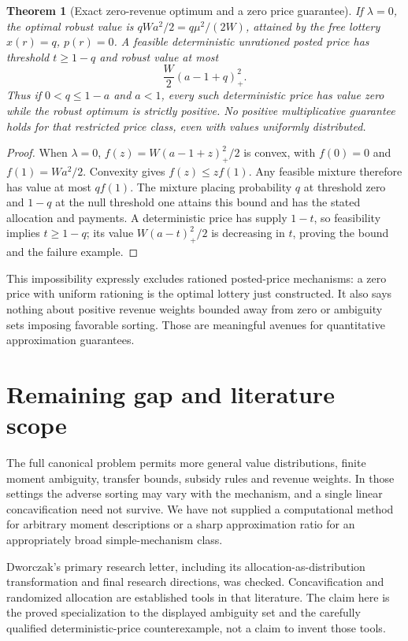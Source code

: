 \documentclass[11pt]{article}
\newtheorem{theorem}{Theorem}
\theoremstyle{remark}\newtheorem{remark}[theorem]{Remark}
\begin{document}
\begin{theorem}[Exact zero-revenue optimum and a zero price guarantee]
If $\lambda=0$, the optimal robust value is $qWa^2/2=q\mu^2/(2W)$, attained by the free lottery $x(r)=q$, $p(r)=0$. A feasible deterministic unrationed posted price has threshold $t\ge1-q$ and robust value at most
\[
 \frac W2(a-1+q)_+^2.
\]
Thus if $0<q\le1-a$ and $a<1$, every such deterministic price has value zero while the robust optimum is strictly positive. No positive multiplicative guarantee holds for that restricted price class, even with values uniformly distributed.
\end{theorem}
\begin{proof}
When $\lambda=0$, $f(z)=W(a-1+z)_+^2/2$ is convex, with $f(0)=0$ and $f(1)=Wa^2/2$. Convexity gives $f(z)\le zf(1)$. Any feasible mixture therefore has value at most $qf(1)$. The mixture placing probability $q$ at threshold zero and $1-q$ at the null threshold one attains this bound and has the stated allocation and payments. A deterministic price has supply $1-t$, so feasibility implies $t\ge1-q$; its value $W(a-t)_+^2/2$ is decreasing in $t$, proving the bound and the failure example.
\end{proof}

This impossibility expressly excludes rationed posted-price mechanisms: a zero price with uniform rationing is the optimal lottery just constructed. It also says nothing about positive revenue weights bounded away from zero or ambiguity sets imposing favorable sorting. Those are meaningful avenues for quantitative approximation guarantees.

\section*{Remaining gap and literature scope}
The full canonical problem permits more general value distributions, finite moment ambiguity, transfer bounds, subsidy rules and revenue weights. In those settings the adverse sorting may vary with the mechanism, and a single linear concavification need not survive. We have not supplied a computational method for arbitrary moment descriptions or a sharp approximation ratio for an appropriately broad simple-mechanism class.

Dworczak's primary research letter, including its allocation-as-distribution transformation and final research directions, was checked. Concavification and randomized allocation are established tools in that literature. The claim here is the proved specialization to the displayed ambiguity set and the carefully qualified deterministic-price counterexample, not a claim to invent those tools.
\end{document}
